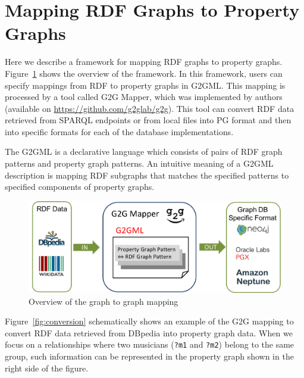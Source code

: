 \documentclass[runningheads]{llncs}
\begin{document}
\section{Mapping RDF Graphs to Property Graphs}

Here we describe a framework for mapping RDF graphs to property graphs.
Figure~\ref{fig:dataflow} shows the overview of the framework.
In this framework, users can specify mappings from RDF to property graphs in G2GML.
This mapping is processed by a tool called G2G Mapper, which was implemented by authors (available on \url{https://github.com/g2glab/g2g}). This tool can convert RDF data retrieved from SPARQL endpoints or from local files into PG format and then into specific formats for each of the database implementations.

The G2GML is a declarative language which consists of pairs of RDF graph patterns and property graph patterns. 
An intuitive meaning of a G2GML description is mapping RDF subgraphs that matches the specified patterns to specified components of property graphs. 


\begin{figure}
\center
\includegraphics[width=1.0\textwidth]{dataflow.png}
\caption{Overview of the graph to graph mapping}
\label{fig:dataflow}
\end{figure}


Figure~\ref{fig:conversion} schematically shows an example of the G2G mapping to convert RDF data retrieved from DBpedia into property graph data. 
When we focus on a relationships where two musicians (\texttt{?m1} and \texttt{?m2}) belong to the same group, such information can be represented in the property graph shown in the right side of the figure.
\end{document}
